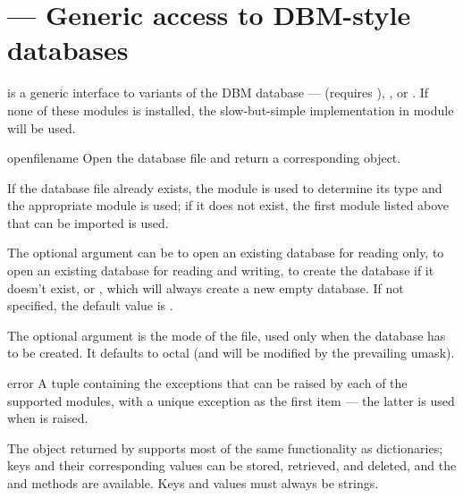 \section{ ---
         Generic access to DBM-style databases}



 is a generic interface to variants of the DBM
database ---  (requires
),
, or
.  If none of these modules is
installed, the slow-but-simple implementation in module
 will be used.

\begin{funcdesc}{open}{filename}
Open the database file  and return a corresponding object.

If the database file already exists, the  module is 
used to determine its type and the appropriate module is used; if it
does not exist, the first module listed above that can be imported is
used.

The optional  argument can be
 to open an existing database for reading only,
 to open an existing database for reading and writing,
 to create the database if it doesn't exist, or
, which will always create a new empty database.  If not
specified, the default value is .

The optional  argument is the \UNIX{} mode of the file, used
only when the database has to be created.  It defaults to octal
 (and will be modified by the prevailing umask).
\end{funcdesc}

\begin{excdesc}{error}
A tuple containing the exceptions that can be raised by each of the
supported modules, with a unique exception  as
the first item --- the latter is used when  is
raised.
\end{excdesc}

The object returned by  supports most of the same
functionality as dictionaries; keys and their corresponding values can
be stored, retrieved, and deleted, and the  and
 methods are available.  Keys and values must always be
strings.

